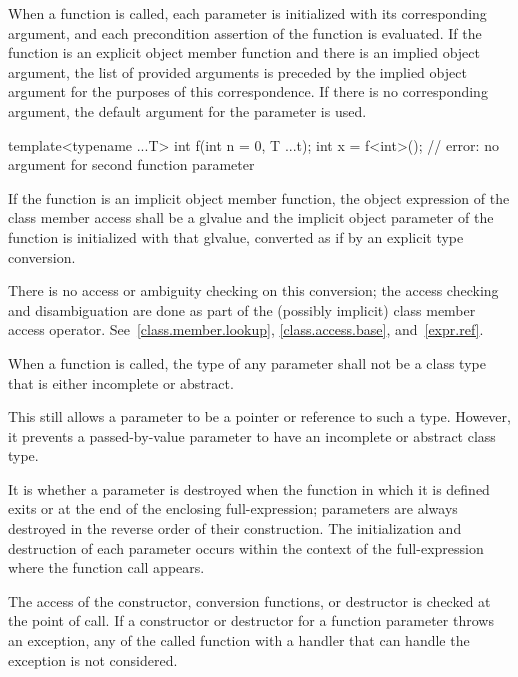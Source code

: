 \pnum
{}%
%
%
When a function is called, each parameter is
initialized with
its corresponding argument,
and each precondition assertion of the function
is evaluated.
If the function is an explicit object member function and
there is an implied object argument,
the list of provided arguments is preceded by the implied object argument
for the purposes of this correspondence.
If there is no corresponding argument,
the default argument for the parameter is used.
\begin{example}
\begin{codeblock}
template<typename ...T> int f(int n = 0, T ...t);
int x = f<int>();               // error: no argument for second function parameter
\end{codeblock}
\end{example}
If the function is an implicit object member
function,
the object expression of the class member access shall be a glvalue and
the implicit object parameter of the function
is initialized with that glvalue,
converted as if by an explicit type conversion.
\begin{note}
There is no access or ambiguity checking on this conversion; the access
checking and disambiguation are done as part of the (possibly implicit)
class member access operator.
See~\ref{class.member.lookup}, \ref{class.access.base},
and~\ref{expr.ref}.
\end{note}
When a function is called, the type of any parameter
shall not be a class type that is either incomplete or abstract.
\begin{note}
This still allows a parameter to be a pointer or reference to such
a type. However, it prevents a passed-by-value parameter
to have an incomplete or abstract class type.
\end{note}
It is 
whether a parameter is destroyed
when the function in which it is defined exits
or at the end of the enclosing full-expression;
parameters are always destroyed in the reverse order of their construction.
The initialization and destruction of each parameter occurs
within the context of the full-expression
where the function call appears.
\begin{example}
The access of the
constructor, conversion functions, or destructor is
checked at the point of call. If a constructor
or destructor for a function parameter throws an exception,
any 
of the called function
with a handler that can handle the exception
is not considered.
\end{example}

